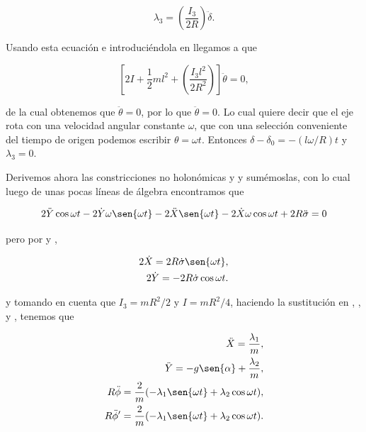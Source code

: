 \documentclass[a4paper,10pt]{article}
\numberwithin{equation}{section}
\begin{document}
\begin{equation}
 \lambda_3 = \left(\frac{I_3}{2R}\right)\ddot{\delta}.
\end{equation}

Usando esta ecuación e introduciéndola en  llegamos a que 

\begin{equation}
 \left[2I + \frac{1}{2}ml^2 + \left(\frac{I_3l^2}{2R^2}\right) \right]\ddot{\theta} = 0,
\end{equation}

de la cual obtenemos que $\ddot{\theta} = 0$, por lo que $\ddot{\theta}=0$. Lo cual 
quiere decir que el eje rota con una velocidad angular constante $\omega$, que con 
una selección conveniente del tiempo de origen podemos escribir $\theta = \omega t$. Entonces 
$\delta - \delta_0 = - (l\omega/R)t$ y $\lambda_3 = 0$. 

\vspace{.3cm}

Derivemos ahora las constricciones no holonómicas  y 
y sumémoslas, con lo cual luego de unas pocas líneas de álgebra encontramos que

\begin{equation}
 2\ddot{Y}\cos{\omega t} - 2\dot{Y}\omega\sen{\omega t} - 2\ddot{X}\sen{\omega t} 
 - 2\dot{X}\omega\cos{\omega t}  + 2R\ddot{\sigma} = 0
\end{equation}

pero por  y ,

\begin{align}
\label{eq:discosConstri4}
 2\dot{X} = 2R\dot{\sigma}\sen{\omega t}, \\
\label{eq:discosConstri5}
 2\dot{Y} = -2R\dot{\sigma}\cos{\omega t}. 
\end{align}

y tomando en cuenta que $I_3 = mR^2/2$ y $I = mR^2/4$, haciendo la sustitución en 
, ,  y ,
tenemos que 

\begin{align}
 \label{eq:1lagrange6}
 \ddot{X} = \frac{\lambda_1}{m}, \\
 \label{eq:1lagrange7}
 \ddot{Y} = - g\sen{\alpha} + \frac{\lambda_2}{m}, \\
 \label{eq:1lagrange8}
 R\ddot{\phi} = \frac{2}{m}(-\lambda_1 \sen{\omega t} + \lambda_2 \cos{\omega t}), \\
 \label{eq:1lagrange9}
 R\ddot{\phi}' = \frac{2}{m}(-\lambda_1 \sen{\omega t} + \lambda_2 \cos{\omega t}).
\end{align}
\end{document}
